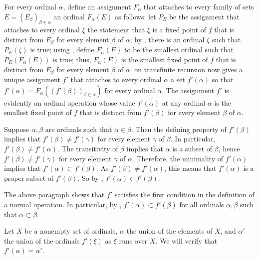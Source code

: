 \documentclass{article}
\begin{document}
\begin{solution}[\ref{exe:e5fhwe1c}]
  \label{sol:6urt5uq0}
  For every ordinal \(\alpha\), define an assignment \(F_\alpha\) that
  attaches to every family of sets
  \(E = (E_\beta)_{\beta \in \alpha}\) an ordinal \(F_\alpha(E)\) as
  follows: let \(P_E\) be the assignment that attaches to every
  ordinal \(\xi\) the statement that \(\xi\) is a fixed point of \(f\)
  that is distinct from \(E_\beta\) for every element \(\beta\) of
  \(\alpha\); by , there is an ordinal \(\zeta\)
  such that \(P_E(\zeta)\) is true; using , define
  \(F_\alpha(E)\) to be the smallest ordinal such that
  \(P_E(F_\alpha(E))\) is true; thus, \(F_\alpha(E)\) is the smallest
  fixed point of \(f\) that is distinct from \(E_\beta\) for every
  element \(\beta\) of \(\alpha\).   on transfinite
  recursion now gives a unique assignment \(f'\) that attaches to
  every ordinal \(\alpha\) a set \(f'(\alpha)\) so that
  \(f'(\alpha) = F_\alpha((f'(\beta))_{\beta \in \alpha})\) for every
  ordinal \(\alpha\).  The assignment \(f'\) is evidently an ordinal
  operation whose value \(f'(\alpha)\) at any ordinal \(\alpha\) is
  the smallest fixed point of \(f\) that is distinct from
  \(f'(\beta)\) for every element \(\beta\) of \(\alpha\).

  Suppose \(\alpha, \beta\) are ordinals such that
  \(\alpha \in \beta\).  Then the defining property of \(f'(\beta)\)
  implies that \(f'(\beta) \neq f'(\gamma)\) for every element
  \(\gamma\) of \(\beta\).  In particular,
  \(f'(\beta) \neq f'(\alpha)\).  The transitivity of \(\beta\)
  implies that \(\alpha\) is a subset of \(\beta\), hence
  \(f'(\beta) \neq f'(\gamma)\) for every element \(\gamma\) of
  \(\alpha\).  Therefore, the minimality of \(f'(\alpha)\) implies
  that \(f'(\alpha) \subset f'(\beta)\).  As
  \(f'(\beta) \neq f'(\alpha)\), this means that \(f'(\alpha)\) is a
  proper subset of \(f'(\beta)\).  So by ,
  \(f'(\alpha) \in f'(\beta)\).

  The above paragraph shows that \(f'\) satisfies the first condition
  in the definition of a normal operation.  In particular, by
  , \(f'(\alpha) \subset f'(\beta)\) for all
  ordinals \(\alpha, \beta\) such that \(\alpha \subset \beta\).

  Let \(X\) be a nonempty set of ordinals, \(\alpha\) the union of the
  elements of \(X\), and \(\alpha'\) the union of the ordinals
  \(f'(\xi)\) as \(\xi\) runs over \(X\).  We will verify that
  \(f'(\alpha) = \alpha'\).


\end{solution}
\end{document}
